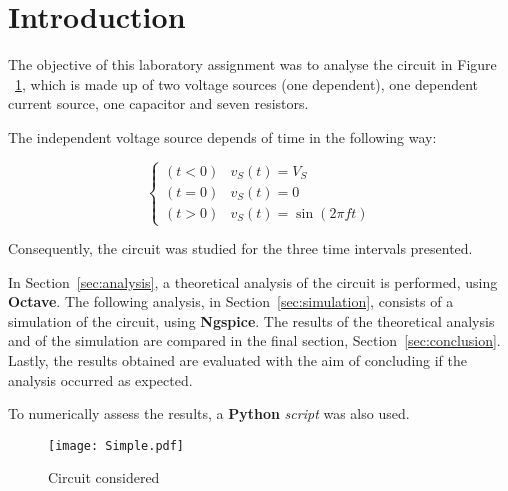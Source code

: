 \newpage

\section{Introduction}
\label{sec:introduction}

The objective of this laboratory assignment was to analyse the circuit in Figure ~\ref{circuit}, which is made up of two voltage sources (one dependent), one dependent current source, one capacitor and seven resistors.

The independent voltage source depends of time in the following way:

\begin{equation}
  \begin{cases}
    (t < 0) & v_S(t) = V_S \\
    (t = 0) & v_S(t) = 0 \\
    (t > 0) & v_S(t) = \sin(2\pi ft)
  \end{cases}
\end{equation}

Consequently, the circuit was studied for the three time intervals presented.

In Section~\ref{sec:analysis}, a theoretical analysis of the circuit is performed, using {\bf Octave}. The following analysis, in Section~\ref{sec:simulation}, consists of a simulation of the circuit, using {\bf Ngspice}. The results of the theoretical analysis and of the simulation are compared in the final section, Section~\ref{sec:conclusion}. Lastly, the results obtained are evaluated with the aim of concluding if the analysis occurred as expected.

To numerically assess the results, a {\bf Python} {\it script} was also used.



\begin{figure}[H]
  \centering
  \texttt{[image: Simple.pdf]}
  \caption{Circuit considered}
  \label{circuit}
\end{figure}

